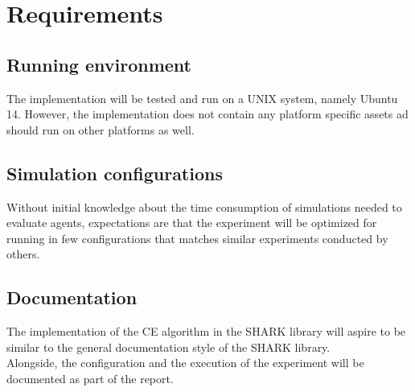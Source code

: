 \section*{Requirements}

\subsection*{Running environment}
The implementation will be tested and run 
on a UNIX system, namely Ubuntu 14. However, 
the implementation does not contain 
any platform specific assets ad should run on 
other platforms as well. 

\subsection*{Simulation configurations}
Without initial knowledge about the time consumption of simulations 
needed to evaluate agents, expectations are that the 
experiment will be optimized for running in few configurations
that matches similar experiments conducted by others.

\subsection*{Documentation}
The implementation of the CE algorithm in the SHARK 
library will aspire to be similar to the general 
documentation style of the SHARK library.\\
Alongside, the configuration and the execution of the 
experiment will be documented as part of the report.
